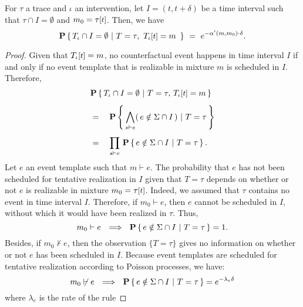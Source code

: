 \begin{proposition*}
  For $\tau$ a trace
  and $\iota$ an intervention, let $I = (t, t+\delta)$ be a time interval
  such that $\tau \cap I = \emptyset$ and $m_0 =
  \TSTATE{t}{\tau}$. Then, we have
  \[\CProb{ \ATRAJ{} \cap I = \emptyset }{ T=\tau,\
      \TSTATE{t}{\ATRAJ{}} = m\ }
    \ =\ e^{-\alpha'(m, m_0) \cdot \delta}.
  \]
\end{proposition*}
\begin{proof}

  Given that $\TSTATE{t}{\ATRAJ{}} = m$, no counterfactual event
  happens in time interval $I$ if and only if no event template that
  is realizable in mixture $m$ is scheduled in $I$. Therefore,
  \vskip 0.0cm
  \begin{equation}\label{eqn:scheduled-decomposition}
    \begin{aligned}
      &\CProb{ \ATRAJ{} \cap I = \emptyset } { T=\tau,\,
        \TSTATE{t}{\ATRAJ{}} = m }
      \\[0.4em]
      &= \quad \CProb{ \bigwedge_{s \vdash e} (\,e \notin \Sigma \cap
        I \,) }{ T=\tau }
      \\[0.4em]
      &= \quad \prod_{s \vdash e}\, \CProb{e \notin \Sigma \cap I }{
        T=\tau }.
    \end{aligned}
  \end{equation}
  \vskip 0.2cm Let $e$ an event template such that $m \vdash e$. The
  probability that $e$ has not been scheduled for tentative
  realization in $I$ given that $T=\tau$ depends on whether or not $e$
  is realizable in mixture $m_0 = \TSTATE{t}{\tau}$. Indeed, we
  assumed that $\tau$ contains no event in time interval
  $I$. Therefore, if $m_0 \vdash e$, then $e$ cannot be scheduled in
  $I$, without which it would have been realized in $\tau$.  Thus,
  \begin{equation}\label{eqn:pscheduled1}
    m_0 \vdash e \ \ \Longrightarrow\ \ \mathbf{P} \left\{\, e \notin \Sigma \cap I \ |\ T=\tau  \,\right\} = 1.
  \end{equation}
  Besides, if $m_0 \not\vdash e$, then the observation $\{ T=\tau \}$
  gives no information on whether or not $e$ has been scheduled in
  $I$. Because event templates are scheduled for tentative realization
  according to Poisson processes, we have:
  \begin{equation}\label{eqn:pscheduled2}
    m_0 \not\vdash e \ \ \Longrightarrow\ \ \mathbf{P} \left\{\, e \notin \Sigma \cap I \ |\ 
      T=\tau  \,\right\} = e^{-\lambda_e \delta}
  \end{equation} where $\lambda_e$ is the rate of the rule 

\end{proof}
